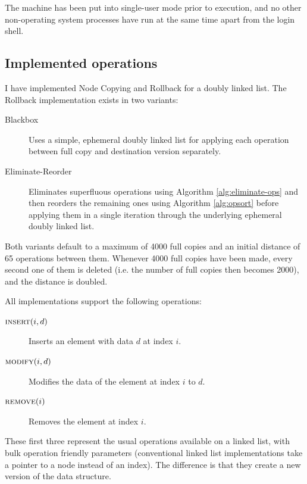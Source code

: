 The machine has been put into single-user mode prior to execution, and no other
non-operating system processes have run at the same time apart from the login
shell.

\subsection{Implemented operations}

I have implemented Node Copying and Rollback for a doubly linked list. The
Rollback implementation exists in two variants:

\begin{description}

  \item[Blackbox] Uses a simple, ephemeral doubly linked list for applying each
   operation between full copy and destination version separately.

  \item[Eliminate-Reorder] Eliminates superfluous operations using Algorithm
  \ref{alg:eliminate-ops} and then reorders the remaining ones using Algorithm
  \ref{alg:opsort} before applying them in a single iteration through the
  underlying ephemeral doubly linked list.

\end{description}

Both variants default to a maximum of 4000 full copies and an initial distance
of 65 operations between them. Whenever 4000 full copies have been made, every
second one of them is deleted (i.e. the number of full copies then becomes
2000), and the distance is doubled.

All implementations support the following operations:

\begin{description}

  \item[$\textsc{insert}(i,d)$] Inserts an element with data $d$ at index $i$.

  \item[$\textsc{modify}(i,d)$] Modifies the data of the element at index $i$ to
  $d$.

  \item[$\textsc{remove}(i)$] Removes the element at index $i$.

\end{description}

These first three represent the usual operations available on a linked list,
with bulk operation friendly parameters (conventional linked list
implementations take a pointer to a node instead of an index). The difference is
that they create a new version of the data structure.

